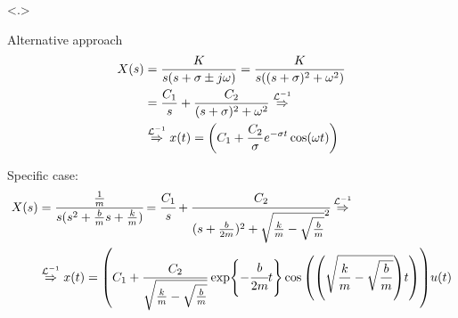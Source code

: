 \documentclass[aspectratio=169]{beamer}
\begin{document}
\begin{frame}
\note<.>{
	Alternative approach
	\begin{align*}
		X(s) &= \frac{K}{s(s+\sigma\pm j\omega)}
		= \frac{K}{s((s+\sigma)^2 + \omega^2)}\\
		&= \frac{C_1}{s} + \frac{C_2}{(s+\sigma)^2 + \omega^2}
		\overset{\mathcal{L}^{-1}}{\Rightarrow}\\
		&\overset{\mathcal{L}^{-1}}{\Rightarrow}
		x(t) = \qty(C_1 + \frac{C_2}{\sigma}e^{-\sigma t} \cos(\omega t))
	\end{align*}

	Specific case:
	\begin{align*}
		X(s) &= \cfrac{\frac{1}{m}}{s (s^2 + \frac{b}{m}s + \frac{k}{m})}
		= \cfrac{C_1}{s} + \cfrac{C_2}{(s+\frac{b}{2m})^2 + \sqrt{\frac{k}{m}-\sqrt{\frac{b}{m}}}^2}
		\overset{\mathcal{L}^{-1}}{\Rightarrow}\\
		&\overset{\mathcal{L}^{-1}}{\Rightarrow}
		x(t) = \qty(C_1 + \frac{C_2}{\sqrt{\frac{k}{m}-\sqrt{\frac{b}{m}}}} \exp{-\cfrac{b}{2m}t} \cos{\qty(\qty(\sqrt{\frac{k}{m}-\sqrt{\frac{b}{m}}})t)}) u(t)
	\end{align*}
}

\end{frame}

\section*{}
\end{document}
